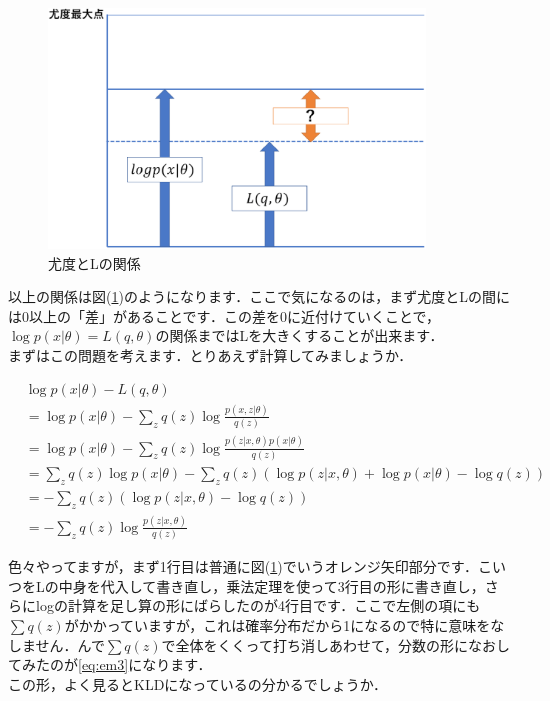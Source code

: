 \documentclass[11pt,a4paper,dvipdfmx]{ujreport}
\begin{document}
\begin{figure}[H]
  \label{im:em1}
  \centering
  \includegraphics[width=10cm]{../figures/em1.eps}
  \caption{尤度とLの関係}
\end{figure}


以上の関係は図(\ref{im:em1})のようになります．ここで気になるのは，まず尤度とLの間には0以上の「差」があることです．この差を0に近付けていくことで，$\log p(x|\theta) = L(q,\theta)$の関係まではLを大きくすることが出来ます．\\

まずはこの問題を考えます．とりあえず計算してみましょうか．

\begin{align}
  &\log p(x|\theta) - L(q,\theta)\nonumber\\
  &=\log p(x|\theta) - \sum_z q(z) \log \frac{p(x,z|\theta)}{q(z)}\nonumber\\
  &=\log p(x|\theta) - \sum_z q(z) \log \frac{p(z|x,\theta)p(x|\theta)}{q(z)}\nonumber\\
  &=\sum_z q(z) \log p(x|\theta) - \sum_z q(z)(\log p(z|x,\theta)+\log p(x|\theta) -\log q(z))\nonumber\\
  &=-\sum_z q(z)(\log p(z|x,\theta) - \log q(z))\nonumber\\
  &=-\sum_z q(z) \log \frac{p(z|x,\theta)}{q(z)}
  \label{eq:em3}
\end{align}

色々やってますが，まず1行目は普通に図(\ref{im:em1})でいうオレンジ矢印部分です．こいつをLの中身を代入して書き直し，乗法定理を使って3行目の形に書き直し，さらにlogの計算を足し算の形にばらしたのが4行目です．ここで左側の項にも$\sum q(z)$がかかっていますが，これは確率分布だから1になるので特に意味をなしません．んで$\sum q(z)$で全体をくくって打ち消しあわせて，分数の形になおしてみたのが\ref{eq:em3}になります．\\

この形，よく見るとKLDになっているの分かるでしょうか．
\end{document}
